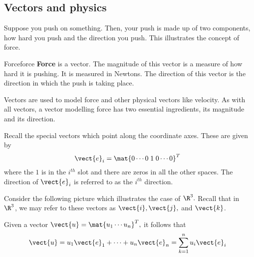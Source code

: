 \subsection{Vectors and physics}

Suppose you push
on something. Then, your push is made up of two components, how hard you push and the direction you push. This illustrates the concept of force.

\begin{definition}{Force}{force}
\textbf{Force} is a vector. The magnitude of this vector is a measure of how
hard it is pushing. It is measured in Newtons. The direction of this vector is the direction in which the push is taking place.
\end{definition}

Vectors are used to model force and other physical vectors like velocity.
 As with all vectors, a vector modelling force has two essential
ingredients, its magnitude and its direction.

Recall the special vectors which point along the coordinate axes.
These are given by 
\begin{equation*}
\vect{e}_{i} = \mat{0 \cdots 0 \; 1 \; 0 \cdots 0 }^T
\end{equation*}
where the $1$ is in the $i^{th}$ slot and there are zeros in all the other
spaces. The direction of $\vect{e}_{i}$ is referred to as the $i^{th}$ direction.

Consider the following picture which illustrates the case of $\R^{3}.$ 
Recall that in $\R^3$, we may refer to these vectors as $\vect{i}, \vect{j},$ and $\vect{k}$. 

\begin{center}
\end{center}

Given a vector $\vect{u}=\mat{u_{1} \cdots u_{n}}^T ,$ it follows
that
\begin{equation*}
\vect{u}=u_{1}\vect{e}_{1}+\cdots +u_{n}\vect{e}_{n}=
\sum_{k=1}^{n}u_{i}\vect{e}_{i}
\end{equation*}


